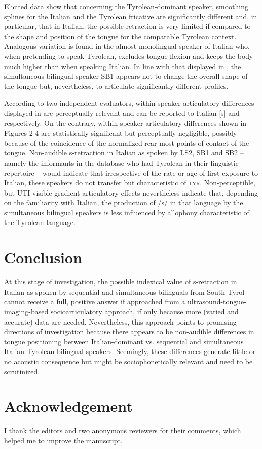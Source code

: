 \documentclass[output=paper]{LSP/langsci}
\begin{document}
Elicited data show that concerning the Tyrolean-dominant speaker, smoothing splines for the Italian and the Tyrolean fricative are significantly different and, in particular, that in Italian, the possible retraction is very limited if compared to the shape and position of the tongue for the comparable Tyrolean context. Analogous variation is found in the almost monolingual speaker of Italian who, when pretending to speak Tyrolean, excludes tongue flexion and keeps the body much higher than when speaking Italian. In line with that displayed in , the simultaneous bilingual speaker SB1 appears not to change the overall shape of the tongue but, nevertheless, to articulate significantly different profiles.

According to two independent evaluators, within-speaker articulatory differences displayed in  are perceptually relevant and can be reported to Italian [s] and %
respectively. On the contrary, within-speaker articulatory differences shown in Figures 2-4 are statistically significant but perceptually negligible, possibly because of the coincidence of the normalized rear-most points of contact of the tongue. Non-audible s-retraction in Italian as spoken by LS2, SB1 and SB2 – namely the informants in the database who had Tyrolean in their linguistic repertoire – would indicate that irrespective of the rate or age of first exposure to Italian, these speakers do not transfer but %
characteristic of \textsc{tyr}. Non-perceptible, but UTI-visible gradient articulatory effects nevertheless indicate that, depending on the familiarity with Italian, the production of /s/ in that language by the simultaneous bilingual speakers is less influenced by 
allophony characteristic of the Tyrolean language.

\section{Conclusion}
At this stage of investigation, the possible indexical value of s-retraction in Italian as spoken by sequential and simultaneous bilinguals from South Tyrol cannot receive a full, positive answer if approached from a ultrasound-tongue-imaging-based socioarticulatory approach, if only because more (varied and accurate) data are needed. Nevertheless, this approach points to promising directions of investigation because there appears to be non-audible differences in tongue positioning between Italian-dominant vs. sequential and simultaneous Italian-Tyrolean bilingual speakers. Seemingly, these differences generate little or no acoustic consequence but might be sociophonetically relevant and need to be scrutinized.

\section*{Acknowledgement}
I thank the editors and two anonymous reviewers for their comments, which helped me to improve the manuscript.

\printbibliography[heading=subbibliography,notkeyword=this]
\end{document}
